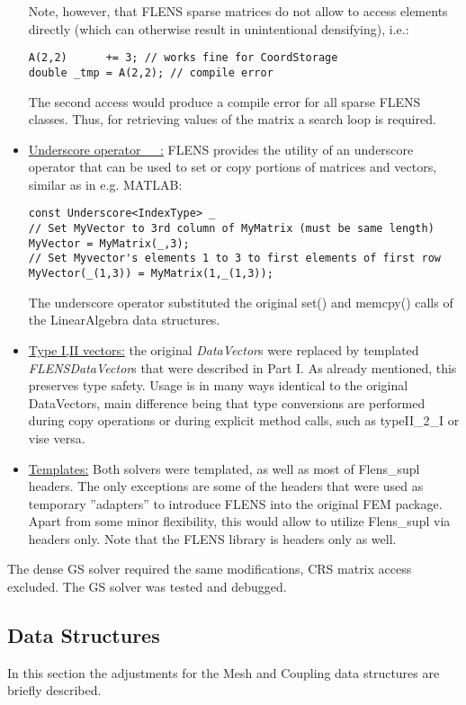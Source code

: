 \begin{itemize}
Note, however, that FLENS sparse matrices do not allow to access elements directly (which can otherwise result in unintentional densifying), i.e.:
\begin{lstlisting}
A(2,2)		+= 3; // works fine for CoordStorage
double _tmp	= A(2,2); // compile error
\end{lstlisting}
The second access would produce a compile error for all sparse FLENS classes. Thus, for retrieving values of the matrix a search loop is required.
\item \underline{Underscore operator \textbf{\_} :} FLENS provides the utility of an underscore operator that can be used to set or copy portions of matrices and vectors, similar as in e.g. MATLAB:
\begin{lstlisting}
const Underscore<IndexType> _
// Set MyVector to 3rd column of MyMatrix (must be same length)
MyVector = MyMatrix(_,3);
// Set Myvector's elements 1 to 3 to first elements of first row
MyVector(_(1,3)) = MyMatrix(1,_(1,3));
\end{lstlisting}
The underscore operator substituted the original set() and memcpy() calls of the LinearAlgebra data structures.

\item \underline{Type I,II vectors:} the original \emph{DataVector}s were replaced by templated \emph{FLENSDataVector}s that were described in Part I. As already mentioned, this preserves type safety. Usage is in many ways identical to the original DataVectors, main difference being that type conversions are performed during copy operations or during explicit method calls, such as typeII\_2\_I or vise versa.

\item \underline{Templates:} Both solvers were templated, as well as most of Flens\_supl headers. The only exceptions are some of the headers that were used as temporary ''adapters'' to introduce FLENS into the original FEM package. Apart from some minor flexibility, this would allow to utilize Flens\_supl via headers only. Note that the FLENS library is headers only as well.
\end{itemize}
The dense GS solver required the same modifications, CRS matrix access excluded. The GS solver was tested and debugged.

\subsection{Data Structures}
In this section the adjustments for the Mesh and Coupling data structures are briefly described.
